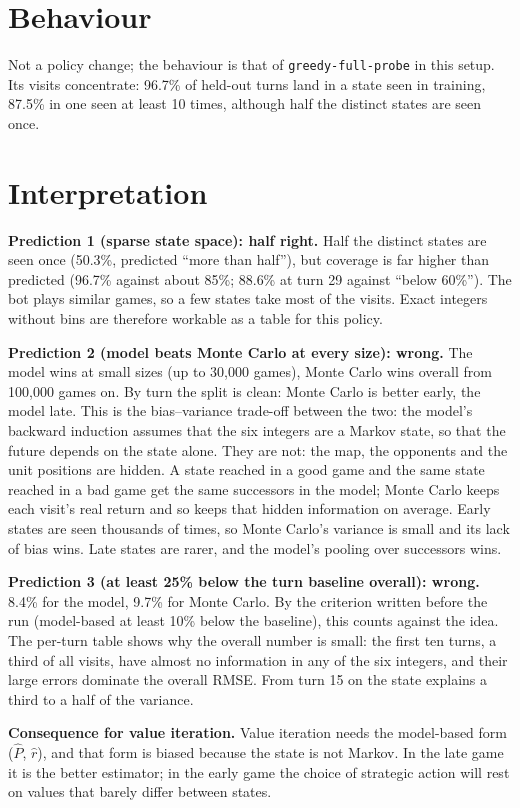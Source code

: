\documentclass{../polyexp}
\begin{document}
\section{Behaviour}
Not a policy change; the behaviour is that of \texttt{greedy-full-probe} in this setup. Its visits concentrate:
96.7\% of held-out turns land in a state seen in training, 87.5\% in one seen at least 10 times, although half
the distinct states are seen once.

\section{Interpretation}
\textbf{Prediction 1 (sparse state space): half right.} Half the distinct states are seen once (50.3\%, predicted
``more than half''), but coverage is far higher than predicted (96.7\% against about 85\%; 88.6\% at turn 29
against ``below 60\%''). The bot plays similar games, so a few states take most of the visits. Exact integers
without bins are therefore workable as a table for this policy.

\textbf{Prediction 2 (model beats Monte Carlo at every size): wrong.} The model wins at small sizes (up to 30{,}000
games), Monte Carlo wins overall from 100{,}000 games on. By turn the split is clean: Monte Carlo is better
early, the model late. This is the bias--variance trade-off between the two: the model's backward induction
assumes that the six integers are a Markov state, so that the future depends on the state alone. They are not:
the map, the opponents and the unit positions are hidden. A state reached in a good game and the same state
reached in a bad game get the same successors in the model; Monte Carlo keeps each visit's real return and so
keeps that hidden information on average. Early states are seen thousands of times, so Monte Carlo's variance is
small and its lack of bias wins. Late states are rarer, and the model's pooling over successors wins.

\textbf{Prediction 3 (at least 25\% below the turn baseline overall): wrong.} 8.4\% for the model, 9.7\% for Monte
Carlo. By the criterion written before the run (model-based at least 10\% below the baseline), this counts
against the idea. The per-turn table shows why the overall number is small: the first ten turns, a third of all
visits, have almost no information in any of the six integers, and their large errors dominate the overall
RMSE. From turn 15 on the state explains a third to a half of the variance.

\textbf{Consequence for value iteration.} Value iteration needs the model-based form ($\hat P$, $\hat r$), and
that form is biased because the state is not Markov. In the late game it is the better estimator; in the early
game the choice of strategic action will rest on values that barely differ between states.
\end{document}

